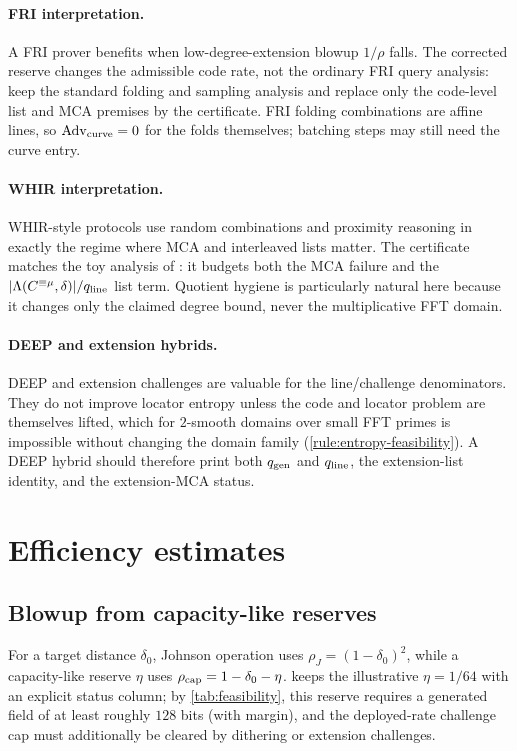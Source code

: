 \documentclass[11pt]{article}
\theoremstyle{definition}
\newcommand{\qgen}{q_{\rm gen}}
\newcommand{\qline}{q_{\rm line}}
\newcommand{\Adv}{\operatorname{Adv}}
\newcommand{\Int}[2]{#1^{\equiv #2}}
\begin{document}
\paragraph{FRI interpretation.}
A FRI prover \cite{FRI} benefits when low-degree-extension blowup $1/\rho$ falls.  The corrected reserve changes the admissible code rate, not the ordinary FRI query analysis: keep the standard folding and sampling analysis and replace only the code-level list and MCA premises by the certificate.  FRI folding combinations are affine lines, so $\Adv_{\rm curve}=0$ for the folds themselves; batching steps may still need the curve entry.

\paragraph{WHIR interpretation.}
WHIR-style protocols \cite{ACFY25} use random combinations and proximity reasoning in exactly the regime where MCA and interleaved lists matter.  The certificate matches the toy analysis of \cite{ABF26}: it budgets both the MCA failure and the $|\Lambda(\Int{C}{\mu},\delta)|/\qline$ list term.  Quotient hygiene is particularly natural here because it changes only the claimed degree bound, never the multiplicative FFT domain.

\paragraph{DEEP and extension hybrids.}
DEEP and extension challenges \cite{BGKS20} are valuable for the line/challenge denominators.  They do not improve locator entropy unless the code and locator problem are themselves lifted, which for $2$-smooth domains over small FFT primes is impossible without changing the domain family (\cref{rule:entropy-feasibility}).  A DEEP hybrid should therefore print both $\qgen$ and $\qline$, the extension-list identity, and the extension-MCA status.

\section{Efficiency estimates}
\label{sec:efficiency}

\subsection{Blowup from capacity-like reserves}

For a target distance $\delta_0$, Johnson operation uses $\rho_J=(1-\delta_0)^2$, while a capacity-like reserve $\eta$ uses $\rho_{\rm cap}=1-\delta_0-\eta$.   keeps the illustrative $\eta=1/64$ with an explicit status column; by \cref{tab:feasibility}, this reserve requires a generated field of at least roughly $128$ bits (with margin), and the deployed-rate challenge cap must additionally be cleared by dithering or extension challenges.
\end{document}
